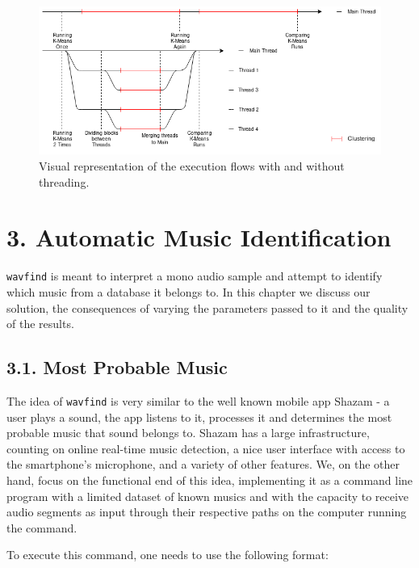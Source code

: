 \documentclass[12pt]{article}
\begin{document}
\begin{figure}[H]
  \centering
  \begin{minipage}{\textwidth}
    \centering
    \includegraphics[width=0.95\linewidth]{threading.png}
  \end{minipage}%
  \caption{Visual representation of the execution flows with and without threading.}
  \label{fig:threading}
\end{figure}

\newpage
\section*{3. Automatic Music Identification}

\texttt{wavfind} is meant to interpret a mono audio sample and attempt to identify which music 
from a database it belongs to.
In this chapter we discuss our solution, the consequences of varying the 
parameters passed to it and the quality of the results.

\subsection*{3.1. Most Probable Music}

The idea of \texttt{wavfind} is very similar to the well known mobile app Shazam 
\cite{shazam} - a user plays a sound, the app listens to it, processes it and
determines the most probable music that sound belongs to.
Shazam has a large infrastructure, counting on online real-time music detection,
a nice user interface with access to the smartphone's microphone, and a variety
of other features.
We, on the other hand, focus on the functional end of this idea, implementing
it as a command line program with a limited dataset of known musics and with
the capacity to receive audio segments as input through their respective paths 
on the computer running the command.

To execute this command, one needs to use the following format:
\end{document}
